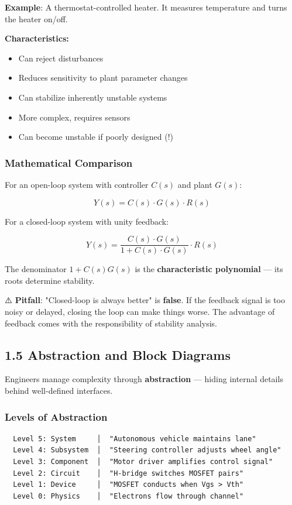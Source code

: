 \documentclass[11pt,a4paper]{book}
\begin{document}
\textbf{Example}: A thermostat-controlled heater. It measures temperature and turns the heater on/off.

\textbf{Characteristics:}
\begin{itemize}
\item Can reject disturbances
\item Reduces sensitivity to plant parameter changes
\item Can stabilize inherently unstable systems
\item More complex, requires sensors
\item Can become unstable if poorly designed (!)
\end{itemize}

\subsubsection{Mathematical Comparison}

For an open-loop system with controller $C(s)$ and plant $G(s)$:

\[Y(s) = C(s) \cdot G(s) \cdot R(s)\]

For a closed-loop system with unity feedback:

\[Y(s) = \frac{C(s) \cdot G(s)}{1 + C(s) \cdot G(s)} \cdot R(s)\]

The denominator $1 + C(s)G(s)$ is the \textbf{characteristic polynomial} — its roots determine stability.

⚠️ \textbf{Pitfall}: "Closed-loop is always better" is \textbf{false}. If the feedback signal is too noisy or delayed, closing the loop can make things worse. The advantage of feedback comes with the responsibility of stability analysis.

\medskip\noindent\hrulefill\medskip

\subsection{1.5 Abstraction and Block Diagrams}

Engineers manage complexity through \textbf{abstraction} — hiding internal details behind well-defined interfaces.

\subsubsection{Levels of Abstraction}

\begin{lstlisting}
  Level 5: System     │  "Autonomous vehicle maintains lane"
  Level 4: Subsystem  │  "Steering controller adjusts wheel angle"
  Level 3: Component  │  "Motor driver amplifies control signal"
  Level 2: Circuit    │  "H-bridge switches MOSFET pairs"
  Level 1: Device     │  "MOSFET conducts when Vgs > Vth"
  Level 0: Physics    │  "Electrons flow through channel"
\end{lstlisting}
\end{document}
